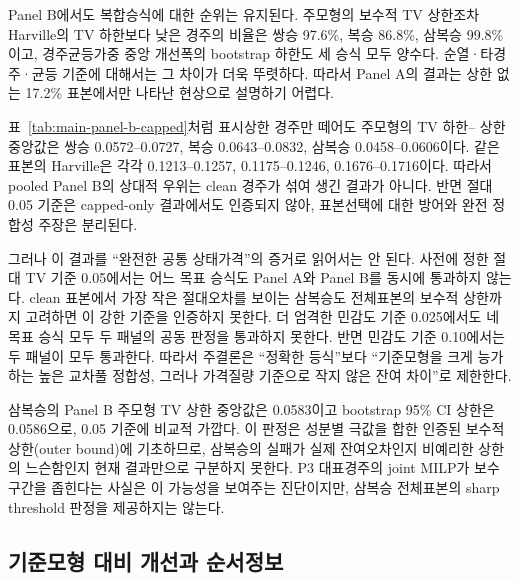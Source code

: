 Panel B에서도 복합승식에 대한 순위는 유지된다. 주모형의 보수적 TV 상한조차
Harville의 TV 하한보다 낮은 경주의 비율은 쌍승 97.6\%, 복승 86.8\%,
삼복승 99.8\%이고, 경주균등가중 중앙 개선폭의 bootstrap 하한도 세 승식 모두
양수다. 순열·타경주·균등 기준에 대해서는 그 차이가 더욱 뚜렷하다. 따라서
Panel A의 결과는 상한 없는 17.2\% 표본에서만 나타난 현상으로 설명하기 어렵다.

\begin{table}[htbp]
\centering
\caption{Panel B의 표시상한 경주 전용 결과. 전체 19,284개 경주 중 공통
clean 표본 3,321개를 제외한 15,963개 경주만 사용한다.}
\label{tab:main-panel-b-capped}
\resizebox{0.86\textwidth}{!}{}
\end{table}

표~\ref{tab:main-panel-b-capped}처럼 표시상한 경주만 떼어도 주모형의 TV 하한--
상한 중앙값은 쌍승 0.0572--0.0727, 복승 0.0643--0.0832, 삼복승
0.0458--0.0606이다. 같은 표본의 Harville은 각각 0.1213--0.1257,
0.1175--0.1246, 0.1676--0.1716이다. 따라서 pooled Panel B의 상대적 우위는
clean 경주가 섞여 생긴 결과가 아니다. 반면 절대 0.05 기준은 capped-only
결과에서도 인증되지 않아, 표본선택에 대한 방어와 완전 정합성 주장은 분리된다.

그러나 이 결과를 ``완전한 공통 상태가격''의 증거로 읽어서는 안 된다.
사전에 정한 절대 TV 기준 0.05에서는 어느 목표 승식도 Panel A와 Panel B를
동시에 통과하지 않는다. clean 표본에서 가장 작은 절대오차를 보이는 삼복승도
전체표본의 보수적 상한까지 고려하면 이 강한 기준을 인증하지 못한다. 더 엄격한
민감도 기준 0.025에서도 네 목표 승식 모두 두 패널의 공동 판정을 통과하지
못한다. 반면 민감도 기준 0.10에서는 두 패널이 모두 통과한다. 따라서 주결론은
``정확한 등식''보다 ``기준모형을 크게 능가하는 높은 교차풀 정합성, 그러나
가격질량 기준으로 작지 않은 잔여 차이''로 제한한다.

삼복승의 Panel B 주모형 TV 상한 중앙값은 0.0583이고 bootstrap 95\% CI
상한은 0.0586으로, 0.05 기준에 비교적 가깝다. 이 판정은 성분별 극값을 합한
인증된 보수적 상한(outer bound)에 기초하므로, 삼복승의 실패가 실제
잔여오차인지 비예리한
상한의 느슨함인지 현재 결과만으로 구분하지 못한다. P3 대표경주의 joint MILP가
보수구간을 좁힌다는 사실은 이 가능성을 보여주는 진단이지만, 삼복승 전체표본의
sharp threshold 판정을 제공하지는 않는다.

\subsection{기준모형 대비 개선과 순서정보}

